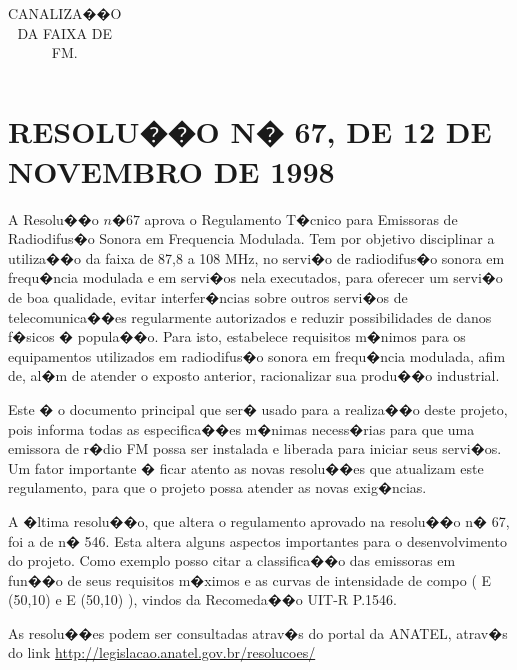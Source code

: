 \begin{table}
\begin{tabular}{|c|c|c|c|c|c|}
\end{tabular}
\caption{CANALIZA��O DA FAIXA DE FM.}
\label{tabelaCanalizacao}
\end{table}




\chapter{RESOLU��O N� 67, DE 12 DE NOVEMBRO DE 1998}

A Resolu��o $n�67$ aprova o Regulamento T�cnico para Emissoras de Radiodifus�o Sonora em Frequencia Modulada. 
Tem por objetivo disciplinar a utiliza��o da faixa de 87,8 a 108 MHz, no servi�o de radiodifus�o sonora em frequ�ncia modulada
 e em servi�os nela executados, para oferecer um servi�o de boa qualidade, evitar interfer�ncias sobre outros servi�os de
 telecomunica��es regularmente autorizados e reduzir possibilidades de danos f�sicos � popula��o. Para isto, estabelece requisitos
 m�nimos para os equipamentos utilizados em radiodifus�o sonora em frequ�ncia modulada, afim de, al�m de atender o exposto anterior,
 racionalizar sua produ��o industrial.

Este � o documento principal que ser� usado para a realiza��o deste projeto, pois informa todas as especifica��es m�nimas necess�rias para que 
uma emissora de r�dio FM possa ser instalada e liberada para iniciar seus servi�os. Um fator importante � ficar atento as novas resolu��es 
que atualizam este regulamento, para que o projeto possa atender as novas exig�ncias.

A �ltima resolu��o, que altera o regulamento aprovado na resolu��o n� 67, foi a de n� 546. Esta altera alguns aspectos importantes para o 
desenvolvimento do projeto. Como exemplo
posso citar a classifica��o das emissoras em fun��o de seus requisitos m�ximos e as curvas de intensidade de compo ( E (50,10) e E (50,10) ),
vindos da Recomeda��o UIT-R P.1546.
 
As resolu��es podem ser consultadas atrav�s do portal da ANATEL, atrav�s do link \url{http://legislacao.anatel.gov.br/resolucoes/}


